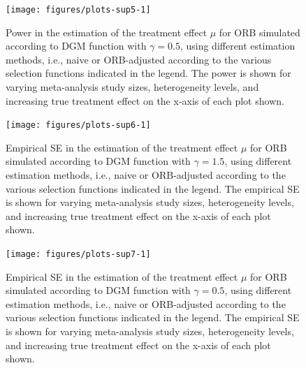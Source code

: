 \documentclass{article}\usepackage[]{graphicx}\usepackage[]{xcolor}
\begin{document}
\begin{figure}[!hbt]
\centering
\caption{Power in the estimation of the treatment effect $\mu$ for ORB simulated according to DGM function with $\gamma=0.5$, using different estimation methods, i.e., naive or ORB-adjusted according to the various selection functions indicated in the legend. The power is shown for varying meta-analysis study sizes, heterogeneity levels, and increasing true treatment effect on the x-axis of each plot shown.\\[0.5em]}


{\centering \texttt{[image: figures/plots-sup5-1]} 

}



\label{Pow2}
\end{figure}




\begin{figure}[!hbt]
\centering
\caption{Empirical SE in the estimation of the treatment effect $\mu$ for ORB simulated according to DGM function with $\gamma=1.5$, using different estimation methods, i.e., naive or ORB-adjusted according to the various selection functions indicated in the legend. The empirical SE is shown for varying meta-analysis study sizes, heterogeneity levels, and increasing true treatment effect on the x-axis of each plot shown.\\[0.5em]}


{\centering \texttt{[image: figures/plots-sup6-1]} 

}



\label{SE1}
\end{figure}


\begin{figure}[!hbt]
\centering
\caption{Empirical SE in the estimation of the treatment effect $\mu$ for ORB simulated according to DGM function with $\gamma=0.5$, using different estimation methods, i.e., naive or ORB-adjusted according to the various selection functions indicated in the legend. The empirical SE is shown for varying meta-analysis study sizes, heterogeneity levels, and increasing true treatment effect on the x-axis of each plot shown.\\[0.5em]}


{\centering \texttt{[image: figures/plots-sup7-1]} 

}



\label{SE2}
\end{figure}
\end{document}
